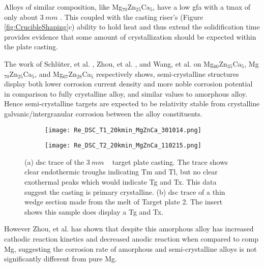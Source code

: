 \documentclass[a4paper,12pt,oneside]{report}%
\begin{document}
Alloys of similar composition, like Mg$_{70}$Zn$_{25}$Ca$_{5}$, have a low \gls{gfa} with a \gls{tmax} of only about $3~ mm$ \cite{Gu2005, Zhou2013}. This coupled with the casting riser's (Figure \ref{fig:CrucibleShaping}c) ability to hold heat and thus extend the solidification time provides evidence that some amount of crystallization should be expected within the plate casting. 

The work of Schlüter, et al. \cite{Schluter2012}, Zhou, et al. \cite{Zhou2013}, and Wang, et al. \cite{Wang2012} on Mg$_{60}$Zn$_{35}$Ca$_{5}$, Mg$_{70}$Zn$_{25}$Ca$_{5}$, and Mg$_{67}$Zn$_{28}$Ca$_{5}$ respectively shows, semi-crystalline structures display both lower corrosion current density and more noble corrosion potential in comparison to fully crystalline alloy, and similar values to amorphous alloy. Hence semi-crystalline targets are expected to be relativity stable from crystalline galvanic/intergranular corrosion between the alloy constituents. 

\begin{figure}[htbp]
	\centering
	\begin{subfigure}[htbp]{0.49\textwidth}
		\texttt{[image: Re\_DSC\_T1\_20kmin\_MgZnCa\_301014.png]}
		\caption{}
		\label{fig:DSCTarget1}
	\end{subfigure}
	\begin{subfigure}[htbp]{0.49\textwidth}
		\texttt{[image: Re\_DSC\_T2\_20kmin\_MgZnCa\_110215.png]}
		\caption{}
		\label{fig:DSCTarget2}
	\end{subfigure}
	\caption{(a) \acrshort{dsc} trace of the $3~ mm$ \MgZnCa~ target plate casting. The trace shows clear endothermic troughs indicating \acrshort{Tm} and \acrshort{Tl}, but no clear exothermal peaks which would indicate \acrshort{Tg} and \acrshort{Tx}. This data suggest the casting is primary crystalline. (b) \acrshort{dsc} trace of a thin wedge section made from the melt of Target plate 2. The insert shows this sample does display a \acrshort{Tg} and \acrshort{Tx}.}%
	\label{fig:DSCTarget1n2}
\end{figure}

However Zhou, et al. \cite{Zhou2013} has shown that despite this amorphous alloy has increased cathodic reaction kinetics and decreased anodic reaction when compared to \acrshort{comp} Mg, suggesting the corrosion rate of amorphous and semi-crystalline alloys is not significantly different from pure Mg. 
\end{document}
